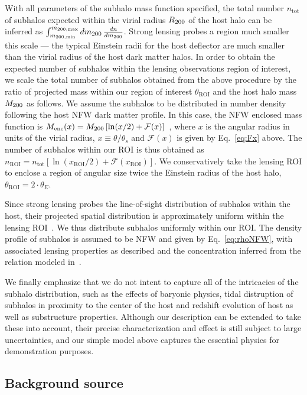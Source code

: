 \documentclass[twocolumn]{aastex62}
\begin{document}
With all parameters of the subhalo mass function specified, the total number $n_\mathrm{tot}$ of subhalos expected within the virial radius $R_{200}$ of the host halo can be inferred as $\int_{m_\mathrm{200, min}}^{m_\mathrm{200, max}}dm_{200}\,\frac{dn}{dm_{200}}$. Strong lensing probes a region much smaller this scale --- the typical Einstein radii for the host deflector are much smaller than the virial radius of the host dark matter halos. In order to obtain the expected number of subhalos within the lensing observations region of interest, we scale the total number of subhalos obtained from the above procedure by the ratio of projected mass within our region of interest $\theta_\textrm{ROI}$ and the host halo mass $M_{200}$ as follows. We assume the subhalos to be distributed in number density following the host NFW dark matter profile. In this case, the NFW enclosed mass function is $M_\mathrm{enc}(x) = M_{200}\left[\ln(x/2) + \mathcal{F}(x)\right]$~\citep{2001astro.ph..2341K}, where $x$ is the angular radius in units of the virial radius, $x\equiv \theta/\theta_s$ and $\mathcal{F}(x)$ is given by Eq.~\ref{eq:Fx} above. The number of subhalos within our ROI is thus obtained as $n_\mathrm{ROI} = n_\mathrm{tot}\left[\ln(x_\mathrm{ROI}/2) + \mathcal{F}(x_\mathrm{ROI})\right]$. We conservatively take the lensing ROI to enclose a region of angular size twice the Einstein radius of the host halo, $\theta_\mathrm{ROI} = 2\cdot\theta_E$.

Since strong lensing probes the line-of-sight distribution of subhalos within the host, their projected spatial distribution is approximately uniform within the lensing ROI~\citep{2017MNRAS.469.1997D}. We thus distribute subhalos uniformly within our ROI. The density profile of subhalos is assumed to be NFW and given by Eq.~\ref{eq:rhoNFW}, with associated lensing properties as described and the concentration inferred from the relation modeled in~\citet{2014MNRAS.442.2271S}.

We finally emphasize that we do not intent to capture all of the intricacies of the subhalo distribution, such as the effects of baryonic physics, tidal distruption of subhalos in proximity to the center of the host and redshift evolution of host as well as substructure properties. Although our description can be extended to take these into account, their precise characterization and effect is still subject to large uncertainties, and our simple model above captures the essential physics for demonstration purposes.

\subsection{Background source}
\end{document}

